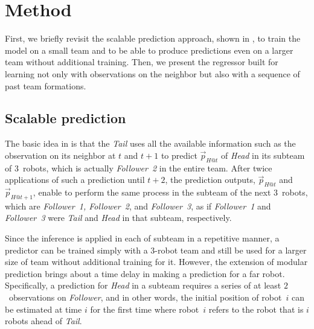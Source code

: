 \documentclass[letterpaper, 10 pt, conference]{ieeeconf}  %
\begin{document}


	\section{Method}
	\label{sec:method}

	First, we briefly revisit the scalable prediction approach, shown in \cite{CPR17},
	to train the model on a small team and to be able to produce predictions
	even on a larger team without additional training.
	Then, we present the regressor built for learning not only with observations on
	the neighbor but also with a sequence of past team formations.


	\subsection{Scalable prediction}
	\label{sec:scalable_prediction}

	The basic idea in \cite{CPR17} is that the \emph{Tail} uses all the available information
	such as the observation on its neighbor
	at $t$ and $t+1$ to predict $\vec{p}_{H@t}$ of \emph{Head} in its subteam of $3$~robots,
	which is actually \emph{Follower~2} in the entire team.
	After twice applications of such a prediction until $t+2$, the prediction outputs,
	$\vec{p}_{H@t}$ and $\vec{p}_{H@t+1}$, enable
	to perform the same process in the subteam of the next $3$~robots, which are
	\emph{Follower~1, Follower~2}, and \emph{Follower~3}, as if \emph{Follower~1} and
	\emph{Follower~3} were \emph{Tail} and \emph{Head} in that subteam, respectively.

	Since the inference is applied in each of subteam in a repetitive manner,
	a predictor can be trained simply with a $3$-robot team and still be used for a larger
	size of team without additional training for it. However, the extension of
	modular prediction brings about a time delay in making a prediction for a far robot.
	Specifically, a prediction for \emph{Head} in a subteam requires a series of at least
	$2$~observations on \emph{Follower}, and in other words,
	the initial position of robot~$i$ can be estimated at time $i$ for the first time
	where robot~$i$ refers to the robot that is $i$ robots ahead of \emph{Tail}.
\end{document}
